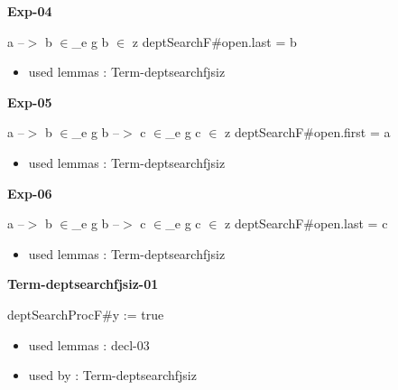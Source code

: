 \documentclass[a4paper]{article}
\begin{document}
\medskip

\bigskip

{\large\bf Exp-04}

\medskip

 \Fol a --$>$ b $\in$\_e g \And b $\in$ z \Imp \Do deptSearchF\#\Dc open.last = b

\begin{itemize}


\item       used lemmas  : Term-deptsearchfjsiz

\end{itemize}

\medskip

\bigskip

{\large\bf Exp-05}

\medskip

 \Fol a --$>$ b $\in$\_e g \And b --$>$ c $\in$\_e g \And c $\in$ z \Imp \Do deptSearchF\#\Dc open.first = a

\begin{itemize}


\item       used lemmas  : Term-deptsearchfjsiz

\end{itemize}

\medskip

\bigskip

{\large\bf Exp-06}

\medskip

 \Fol a --$>$ b $\in$\_e g \And b --$>$ c $\in$\_e g \And c $\in$ z \Imp \Do deptSearchF\#\Dc open.last = c

\begin{itemize}


\item       used lemmas  : Term-deptsearchfjsiz

\end{itemize}

\medskip

\bigskip

{\large\bf Term-deptsearchfjsiz-01}

\medskip

 \Fol \Do deptSearchProcF\#\Dc \Do y := \Dc true

\begin{itemize}


\item       used lemmas  : decl-03
\item       used by      : Term-deptsearchfjsiz

\end{itemize}

\medskip
\end{document}
